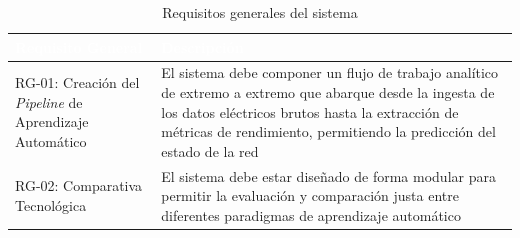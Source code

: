 \begin{table}[htp]
	\centering
	\renewcommand{\arraystretch}{1.3}
		\begin{tabular}{ | m{7cm} | m{8cm} | }
			\hline
			\rowcolor[HTML]{5B9BD5} 
			\textcolor{white}{\textbf{Requisito General}} & \textcolor{white}{\textbf{Descripción}}\\
			\hline
			
			RG-01: Creación del \textit{Pipeline} de Aprendizaje Automático & El sistema debe componer un flujo de trabajo analítico de extremo a extremo que abarque desde la ingesta de los datos eléctricos brutos hasta la extracción de métricas de rendimiento, permitiendo la predicción del estado de la red \\
			\hline
			RG-02: Comparativa Tecnológica & El sistema debe estar diseñado de forma modular para permitir la evaluación y comparación justa entre diferentes paradigmas de aprendizaje automático \\
			\hline
			
		\end{tabular} 
		
		\caption{Requisitos generales del sistema}
	\end{table}